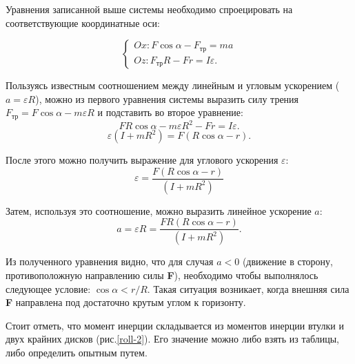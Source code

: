 \documentclass[All.tex]{subfiles}
\begin{document}
Уравнения записанной выше системы необходимо спроецировать на соответствующие координатные оси:

\begin{equation}\label{roll-eq2}
\begin{cases}
Ox: F\cos\alpha - F_{\text{тр}} = ma \\
Oz: F_{\text{тр}}R - Fr= I \varepsilon.
\end{cases}
\end{equation}

Пользуясь известным соотношением между линейным и угловым ускорением ($ a = \varepsilon R $), можно из первого уравнения системы выразить силу трения $  F_{\text{тр}} = F\cos\alpha - m  \varepsilon R $ и подставить во второе уравнение:
\begin{equation}\label{roll-eq3}
F R \cos\alpha - m  \varepsilon R^{2} - Fr= I \varepsilon.
\end{equation}
\begin{equation}\label{roll-eq4}
 \varepsilon (I  + mR^{2})  = F (R \cos \alpha - r).
\end{equation}

После этого можно получить выражение для углового ускорения $ \varepsilon $:
\begin{equation}\label{roll-eq5}
\varepsilon = \frac{F(R \cos \alpha - r)}{(I  + mR^{2})}
\end{equation}

Затем, используя это соотношение, можно выразить линейное ускорение $ a $:
\begin{equation}\label{roll-eq6}
a = \varepsilon R = \frac{FR(R \cos \alpha - r)}{(I + mR^{2})}.
\end{equation}

Из полученного уравнения видно, что для случая $ a<0 $ (движение в сторону, противоположную направлению силы \textbf{F}), необходимо чтобы выполнялось следующее условие: $ \cos \alpha < r/R$. Такая ситуация возникает, когда внешняя сила \textbf{F} направлена под достаточно крутым углом к горизонту.

Стоит отметь, что момент инерции складывается из моментов инерции втулки и двух крайних дисков (рис.\ref{roll-2}).
Его значение можно либо взять из таблицы, либо определить опытным путем.  
\end{document}
